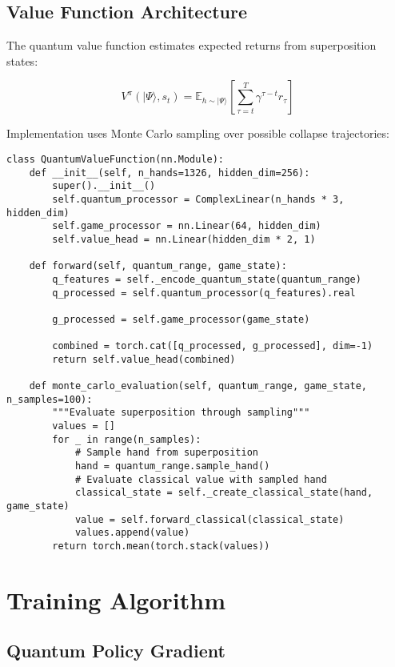 \documentclass[11pt,a4paper]{article}
\begin{document}
\subsection{Value Function Architecture}

The quantum value function estimates expected returns from superposition states:

\begin{equation}
V^{\pi}(|\Psi\rangle, s_t) = \mathbb{E}_{h \sim |\Psi\rangle}\left[\sum_{\tau=t}^T \gamma^{\tau-t} r_\tau\right]
\end{equation}

Implementation uses Monte Carlo sampling over possible collapse trajectories:

\begin{lstlisting}
class QuantumValueFunction(nn.Module):
    def __init__(self, n_hands=1326, hidden_dim=256):
        super().__init__()
        self.quantum_processor = ComplexLinear(n_hands * 3, hidden_dim)
        self.game_processor = nn.Linear(64, hidden_dim)
        self.value_head = nn.Linear(hidden_dim * 2, 1)
        
    def forward(self, quantum_range, game_state):
        q_features = self._encode_quantum_state(quantum_range)
        q_processed = self.quantum_processor(q_features).real
        
        g_processed = self.game_processor(game_state)
        
        combined = torch.cat([q_processed, g_processed], dim=-1)
        return self.value_head(combined)
        
    def monte_carlo_evaluation(self, quantum_range, game_state, n_samples=100):
        """Evaluate superposition through sampling"""
        values = []
        for _ in range(n_samples):
            # Sample hand from superposition
            hand = quantum_range.sample_hand()
            # Evaluate classical value with sampled hand
            classical_state = self._create_classical_state(hand, game_state)
            value = self.forward_classical(classical_state)
            values.append(value)
        return torch.mean(torch.stack(values))
\end{lstlisting}

\section{Training Algorithm}

\subsection{Quantum Policy Gradient}
\end{document}

